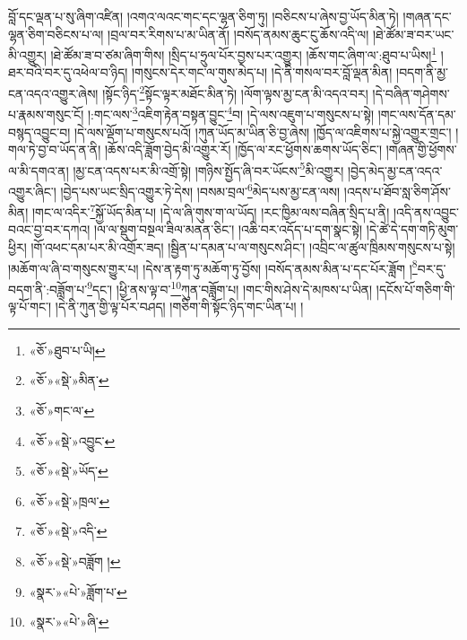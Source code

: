 བློ་དང་ལྡན་པ་སུ་ཞིག་འཛིན། །འགའ་ལའང་གང་དང་ལྷན་ཅིག་ཏུ། །བཅིངས་པ་ཞེས་བྱ་ཡོད་མིན་ཏེ། །གཞན་དང་ལྷན་ཅིག་བཅིངས་པ་ལ། །བྲལ་བར་རིགས་པ་མ་ཡིན་ནོ། །བསོད་ནམས་ཆུང་ངུ་ཆོས་འདི་ལ། །ཐེ་ཚོམ་ཟ་བར་ཡང་མི་འགྱུར། །ཐེ་ཚོམ་ཟ་བ་ཙམ་ཞིག་གིས། །སྲིད་པ་ཧྲུལ་པོར་བྱས་པར་འགྱུར། །ཆོས་གང་ཞིག་ལ་:ཐུབ་པ་ཡིས།\footnote{«ཅོ་»ཐུབ་པ་ཡི།} །ཐར་བའི་བར་དུ་འཕེལ་བ་ཉིད། །གསུངས་དེར་གང་ལ་གུས་མེད་པ། །དེ་ནི་གསལ་བར་བློ་ལྡན་མིན། །བདག་ནི་མྱ་ངན་འདའ་འགྱུར་ཞེས། །སྟོང་ཉིད་\footnote{«ཅོ་»«སྡེ་»མིན་}སྟོང་ལྟར་མཐོང་མིན་ཏེ། །ལོག་ལྟས་མྱ་ངན་མི་འདའ་བར། །དེ་བཞིན་གཤེགས་པ་རྣམས་གསུང་ངོ། །:གང་ལས་\footnote{«ཅོ་»གང་ལ་}འཇིག་རྟེན་བསྟན་བྱུང་\footnote{«ཅོ་»«སྡེ་»འབྱུང་}བ། །དེ་ལས་འཇུག་པ་གསུངས་པ་སྟེ། །གང་ལས་དོན་དམ་བསྙད་འབྱུང་བ། །དེ་ལས་ལྡོག་པ་གསུངས་པའོ། །ཀུན་ཡོད་མ་ཡིན་ཅི་བྱ་ཞེས། །ཁྱོད་ལ་འཇིགས་པ་སྐྱེ་འགྱུར་གྲང་། །གལ་ཏེ་བྱ་བ་ཡོད་ན་ནི། །ཆོས་འདི་ཟློག་བྱེད་མི་འགྱུར་རོ། །ཁྱོད་ལ་རང་ཕྱོགས་ཆགས་ཡོད་ཅིང་། །གཞན་གྱི་ཕྱོགས་ལ་མི་དགའ་ན། །མྱ་ངན་འདས་པར་མི་འགྲོ་སྟེ། །གཉིས་སྤྱོད་ཞི་བར་ཡོངས་\footnote{«ཅོ་»«སྡེ་»ཡོད་}མི་འགྱུར། །བྱེད་མེད་མྱ་ངན་འདའ་འགྱུར་ཞིང་། །བྱེད་པས་ཡང་སྲིད་འགྱུར་ཏེ་དེས། །བསམ་བྲལ་\footnote{«ཅོ་»«སྡེ་»ཁྲལ་}མེད་པས་མྱ་ངན་ལས། །འདས་པ་ཐོབ་སླ་ཅིག་ཤོས་མིན། །གང་ལ་འདིར་\footnote{«ཅོ་»«སྡེ་»འདི་}སྐྱོ་ཡོད་མིན་པ། །དེ་ལ་ཞི་གུས་ག་ལ་ཡོད། །རང་ཁྱིམ་ལས་བཞིན་སྲིད་པ་ནི། །འདི་ནས་འབྱུང་བའང་བྱ་བར་དཀའ། །ལ་ལ་སྡུག་བསྔལ་ཟིལ་མནན་ཅིང་། །འཆི་བར་འདོད་པ་དག་སྣང་སྟེ། །དེ་ཚེ་དེ་དག་གཏི་མུག་ཕྱིར། །གོ་འཕང་དམ་པར་མི་འགྲོར་ཟད། །སྦྱིན་པ་དམན་པ་ལ་གསུངས་ཤིང་། །འབྲིང་ལ་ཚུལ་ཁྲིམས་གསུངས་པ་སྟེ། །མཆོག་ལ་ཞི་བ་གསུངས་གྱུར་པ། །དེས་ན་རྟག་ཏུ་མཆོག་ཏུ་བྱོས། །བསོད་ནམས་མིན་པ་དང་པོར་ཟློག །\footnote{«ཅོ་»«སྡེ་»བཟློག །}བར་དུ་བདག་ནི་:བཟློག་པ་\footnote{«སྣར་»«པེ་»ཟློག་པ་}དང་། །ཕྱི་ནས་ལྟ་བ་\footnote{«སྣར་»«པེ་»ཞི་}ཀུན་བཟློག་པ། །གང་གིས་ཤེས་དེ་མཁས་པ་ཡིན། །དངོས་པོ་གཅིག་གི་ལྟ་པོ་གང་། །དེ་ནི་ཀུན་གྱི་ལྟ་པོར་བཤད། །གཅིག་གི་སྟོང་ཉིད་གང་ཡིན་པ། །
